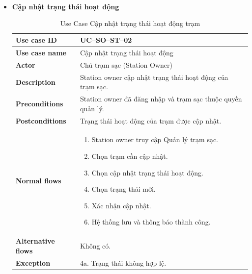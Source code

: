 \begin{enumerate}[label=\textbf{\alph*)}]
\begin{itemize}
  \item \textbf{Cập nhật trạng thái hoạt động}
    \begin{center}
      \renewcommand{\arraystretch}{1.5}
      \begin{longtable}{|m{}|m{}|}
          \caption{Use Case Cập nhật trạng thái hoạt động trạm}
        \label{tab:uc_so_st_02} \\
        \hline
        \textbf{Use case ID} & UC--SO--ST--02 \\
        \hline
        \textbf{Use case name} & Cập nhật trạng thái hoạt động \\
        \hline
        \textbf{Actor} & Chủ trạm sạc (Station Owner) \\
        \hline
        \textbf{Description} & Station owner cập nhật trạng thái hoạt động của trạm sạc. \\
        \hline
        \textbf{Preconditions} &
        Station owner đã đăng nhập và trạm sạc thuộc quyền quản lý.\\
        \hline
        \textbf{Postconditions} &
        Trạng thái hoạt động của trạm được cập nhật.\\
        \hline
        \textbf{Normal flows} &
        \begin{enumerate}[label=\arabic*.]
          \item Station owner truy cập Quản lý trạm sạc.
          \item Chọn trạm cần cập nhật.
          \item Chọn cập nhật trạng thái hoạt động.
          \item Chọn trạng thái mới.
          \item Xác nhận cập nhật.
          \item Hệ thống lưu và thông báo thành công.
        \end{enumerate}\\
        \hline
        \textbf{Alternative flows} &
        Không có.\\
        \hline
        \textbf{Exception} &
        4a. Trạng thái không hợp lệ.\\
        \hline
        \end{longtable}
    \end{center}


\end{itemize}
\end{enumerate}
